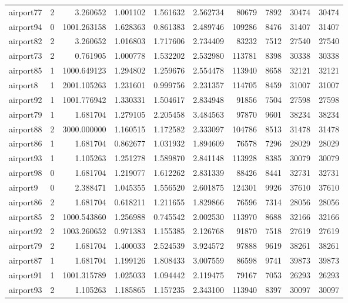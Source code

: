 \begin{longtable}{|l|r|r|r|r|r|r|r|r|r|}
airport77 & 2 & 3.260652 & 1.001102 & 1.561632 & 2.562734 & 80679 & 7892 & 30474 & 30474 \\
airport94 & 0 & 1001.263158 & 1.628363 & 0.861383 & 2.489746 & 109286 & 8476 & 31407 & 31407 \\
airport82 & 2 & 3.260652 & 1.016803 & 1.717606 & 2.734409 & 83232 & 7512 & 27540 & 27540 \\
airport73 & 2 & 0.761905 & 1.000778 & 1.532202 & 2.532980 & 113781 & 8398 & 30338 & 30338 \\
airport85 & 1 & 1000.649123 & 1.294802 & 1.259676 & 2.554478 & 113940 & 8658 & 32121 & 32121 \\
airport8 & 1 & 2001.105263 & 1.231601 & 0.999756 & 2.231357 & 114705 & 8459 & 31007 & 31007 \\
airport92 & 1 & 1001.776942 & 1.330331 & 1.504617 & 2.834948 & 91856 & 7504 & 27598 & 27598 \\
airport79 & 1 & 1.681704 & 1.279105 & 2.205458 & 3.484563 & 97870 & 9601 & 38234 & 38234 \\
airport88 & 2 & 3000.000000 & 1.160515 & 1.172582 & 2.333097 & 104786 & 8513 & 31478 & 31478 \\
airport86 & 1 & 1.681704 & 0.862677 & 1.031932 & 1.894609 & 76578 & 7296 & 28029 & 28029 \\
airport93 & 1 & 1.105263 & 1.251278 & 1.589870 & 2.841148 & 113928 & 8385 & 30079 & 30079 \\
airport98 & 0 & 1.681704 & 1.219077 & 1.612262 & 2.831339 & 88426 & 8441 & 32731 & 32731 \\
airport9 & 0 & 2.388471 & 1.045355 & 1.556520 & 2.601875 & 124301 & 9926 & 37610 & 37610 \\
airport86 & 2 & 1.681704 & 0.618211 & 1.211655 & 1.829866 & 76596 & 7314 & 28056 & 28056 \\
airport85 & 2 & 1000.543860 & 1.256988 & 0.745542 & 2.002530 & 113970 & 8688 & 32166 & 32166 \\
airport92 & 2 & 1003.260652 & 0.971383 & 1.155385 & 2.126768 & 91870 & 7518 & 27619 & 27619 \\
airport79 & 2 & 1.681704 & 1.400033 & 2.524539 & 3.924572 & 97888 & 9619 & 38261 & 38261 \\
airport87 & 1 & 1.681704 & 1.199126 & 1.808433 & 3.007559 & 86598 & 9741 & 39873 & 39873 \\
airport91 & 1 & 1001.315789 & 1.025033 & 1.094442 & 2.119475 & 79167 & 7053 & 26293 & 26293 \\
airport93 & 2 & 1.105263 & 1.185865 & 1.157235 & 2.343100 & 113940 & 8397 & 30097 & 30097 \\

\end{longtable}

